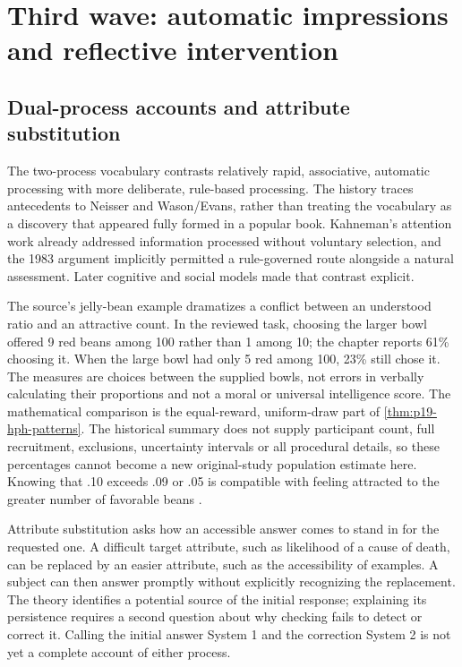 \section{Third wave: automatic impressions and reflective intervention}
\label{sec:p19-hph-third-wave}

\subsection{Dual-process accounts and attribute substitution}

The two-process vocabulary contrasts relatively rapid, associative,
automatic processing with more deliberate, rule-based processing. The
history traces antecedents to Neisser and Wason/Evans, rather than treating
the vocabulary as a discovery that appeared fully formed in a popular
book. Kahneman's attention work already addressed information processed
without voluntary selection, and the 1983 argument implicitly permitted
a rule-governed route alongside a natural assessment. Later cognitive
and social models made that contrast explicit.

The source's jelly-bean example dramatizes a conflict between an understood
ratio and an attractive count. In the reviewed task, choosing the larger
bowl offered 9 red beans among 100 rather than 1 among 10; the chapter
reports 61\% choosing it. When the large bowl had only 5 red among 100,
23\% still chose it. The measures are choices between the supplied bowls,
not errors in verbally calculating their proportions and not a moral or
universal intelligence score. The mathematical comparison is the
equal-reward, uniform-draw part of \cref{thm:p19-hph-patterns}.
The historical summary does not supply participant count, full recruitment,
exclusions, uncertainty intervals or all procedural details, so these
percentages cannot become a new original-study population estimate here.
Knowing that .10 exceeds .09 or .05 is compatible with feeling attracted
to the greater number of favorable beans
\cite[pp.~339--340]{GriffinEtAl2012HeuristicsHistory}.

Attribute substitution asks how an accessible answer comes to stand in
for the requested one. A difficult target attribute, such as likelihood
of a cause of death, can be replaced by an easier attribute, such as
the accessibility of examples. A subject can then answer promptly without
explicitly recognizing the replacement. The theory identifies a potential
source of the initial response; explaining its persistence requires a
second question about why checking fails to detect or correct it.
Calling the initial answer System 1 and the correction System 2 is not
yet a complete account of either process.

